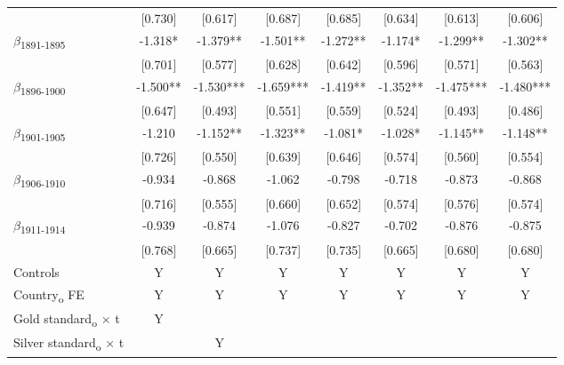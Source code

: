 {\begin{tabular}{l*{7}{c}}
            &     [0.730]   &     [0.617]   &     [0.687]   &     [0.685]   &     [0.634]   &     [0.613]   &     [0.606]   \\
$\beta$\textsubscript{1891-1895}&      -1.318*  &      -1.379** &      -1.501** &      -1.272** &      -1.174*  &      -1.299** &      -1.302** \\
            &     [0.701]   &     [0.577]   &     [0.628]   &     [0.642]   &     [0.596]   &     [0.571]   &     [0.563]   \\
$\beta$\textsubscript{1896-1900}&      -1.500** &      -1.530***&      -1.659***&      -1.419** &      -1.352** &      -1.475***&      -1.480***\\
            &     [0.647]   &     [0.493]   &     [0.551]   &     [0.559]   &     [0.524]   &     [0.493]   &     [0.486]   \\
$\beta$\textsubscript{1901-1905}&      -1.210   &      -1.152** &      -1.323** &      -1.081*  &      -1.028*  &      -1.145** &      -1.148** \\
            &     [0.726]   &     [0.550]   &     [0.639]   &     [0.646]   &     [0.574]   &     [0.560]   &     [0.554]   \\
$\beta$\textsubscript{1906-1910}&      -0.934   &      -0.868   &      -1.062   &      -0.798   &      -0.718   &      -0.873   &      -0.868   \\
            &     [0.716]   &     [0.555]   &     [0.660]   &     [0.652]   &     [0.574]   &     [0.576]   &     [0.574]   \\
$\beta$\textsubscript{1911-1914}&      -0.939   &      -0.874   &      -1.076   &      -0.827   &      -0.702   &      -0.876   &      -0.875   \\
            &     [0.768]   &     [0.665]   &     [0.737]   &     [0.735]   &     [0.665]   &     [0.680]   &     [0.680]   \\
Controls    &           Y   &           Y   &           Y   &           Y   &           Y   &           Y   &           Y   \\
Country\textsubscript{o} FE&           Y   &           Y   &           Y   &           Y   &           Y   &           Y   &           Y   \\
Gold standard\textsubscript{o} $\times$ t&           Y   &               &               &               &               &               &               \\
Silver standard\textsubscript{o} $\times$ t&               &           Y   &               &               &               &               &               \\

\end{tabular}}
